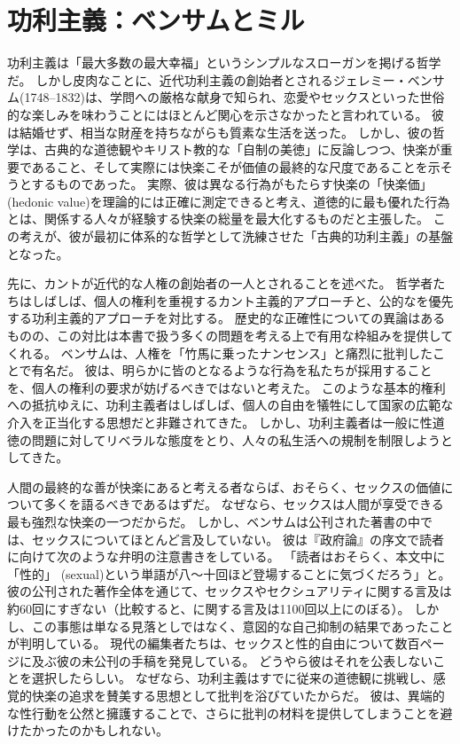 \documentclass[paper=a4,book,openany]{jlreq}
\begin{document}
\section{功利主義：ベンサムとミル}

功利主義は「最大多数の最大幸福」というシンプルなスローガンを掲げる哲学だ。
しかし皮肉なことに、近代功利主義の創始者とされるジェレミー・ベンサム(1748--1832)は、学問への厳格な献身で知られ、恋愛やセックスといった世俗的な楽しみを味わうことにはほとんど関心を示さなかったと言われている。
彼は結婚せず、相当な財産を持ちながらも質素な生活を送った。
しかし、彼の哲学は、古典的な道徳観やキリスト教的な「自制の美徳」に反論しつつ、快楽が重要であること、そして実際には快楽こそが価値の最終的な尺度であることを示そうとするものであった。
実際、彼は異なる行為がもたらす快楽の「快楽価」(hedonic value)を理論的には正確に測定できると考え、道徳的に最も優れた行為とは、関係する人々が経験する快楽の総量を最大化するものだと主張した。
この考えが、彼が最初に体系的な哲学として洗練させた「古典的功利主義」の基盤となった。

先に、カントが近代的な人権の創始者の一人とされることを述べた。
哲学者たちはしばしば、個人の権利を重視するカント主義的アプローチと、公的なを優先する功利主義的アプローチを対比する。
歴史的な正確性についての異論はあるものの、この対比は本書で扱う多くの問題を考える上で有用な枠組みを提供してくれる。
ベンサムは、人権を「竹馬に乗ったナンセンス」と痛烈に批判したことで有名だ。
彼は、明らかに皆のとなるような行為を私たちが採用することを、個人の権利の要求が妨げるべきではないと考えた。
このような基本的権利への抵抗ゆえに、功利主義者はしばしば、個人の自由を犠牲にして国家の広範な介入を正当化する思想だと非難されてきた。
しかし、功利主義者は一般に性道徳の問題に対してリベラルな態度をとり、人々の私生活への規制を制限しようとしてきた。

人間の最終的な善が快楽にあると考える者ならば、おそらく、セックスの価値について多くを語るべきであるはずだ。
なぜなら、セックスは人間が享受できる最も強烈な快楽の一つだからだ。
しかし、ベンサムは公刊された著書の中では、セックスについてほとんど言及していない。
彼は『政府論』の序文で読者に向けて次のような弁明の注意書きをしている。
「読者はおそらく、本文中に「性的」 (sexual)という単語が八〜十回ほど登場することに気づくだろう」と\citep[p.533]{bentham77:_commen_commen_fragm_gover}。
彼の公刊された著作全体を通じて、セックスやセクシュアリティに関する言及は約60回にすぎない（比較すると、に関する言及は1100回以上にのぼる）。
しかし、この事態は単なる見落としではなく、意図的な自己抑制の結果であったことが判明している。
現代の編集者たちは、セックスと性的自由について数百ページに及ぶ彼の未公刊の手稿を発見している。
どうやら彼はそれを公表しないことを選択したらしい。
なぜなら、功利主義はすでに従来の道徳観に挑戦し、感覚的快楽の追求を賛美する思想として批判を浴びていたからだ。
彼は、異端的な性行動を公然と擁護することで、さらに批判の材料を提供してしまうことを避けたかったのかもしれない。
\end{document}
